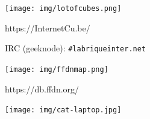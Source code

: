 \documentclass[notes=hide]{beamer}
\begin{document}
\begin{frame}[t,plain]
\begin{center}
  \vspace{\fill}
  \texttt{[image: img/lotofcubes.png]}
  \vspace{\fill}
\end{center}
\end{frame}

\begin{frame}[t,plain]
\huge
\begin{center}
\vspace{\fill}
https://Internet{\color{red}Cu.be}/

{\large IRC (geeknode): \texttt{\#labriqueinter.net}}

\vspace{.4cm}
\texttt{[image: img/ffdnmap.png]}

\vspace{\fill}
https://db.{\color{ffdncolor}ffdn.org}/
\vspace{\fill}
\end{center}
\end{frame}

\begin{frame}[t,plain]
\begin{center}
  \vspace{\fill}
  \texttt{[image: img/cat-laptop.jpg]}
  \vspace{\fill}
\end{center}
\end{frame}
\end{document}

